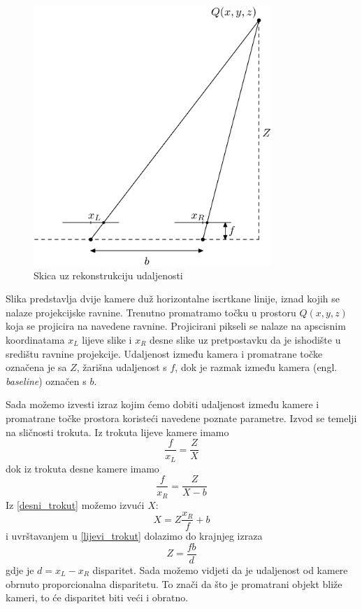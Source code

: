 \documentclass[utf8, zavrsni, numeric]{fer}
\begin{document}
\begin{figure}[htb]
  \centering
  \includegraphics[width=9cm]{img/rekonstrukcija_udaljenosti.png}
  \caption{Skica uz rekonstrukciju udaljenosti}
  \label{fig:rekonstrukcija_udaljenosti}
\end{figure}

Slika predstavlja dvije kamere duž horizontalne iscrtkane linije, iznad kojih se
nalaze projekcijske ravnine. Trenutno promatramo točku u prostoru $Q(x, y, z)$ koja se projicira na navedene ravnine.
Projicirani pikseli se nalaze na apscisnim koordinatama $x_L$ lijeve slike i
$x_R$ desne slike uz pretpostavku da je ishodište u središtu ravnine projekcije. Udaljenost između kamera i promatrane točke označena je sa $Z$, žarišna
udaljenost s $f$, dok je razmak između kamera (engl. {\sl baseline}) označen s $b$.

Sada možemo izvesti izraz kojim ćemo dobiti udaljenost između kamere i promatrane točke prostora
koristeći navedene poznate parametre. Izvod se temelji na sličnosti trokuta. Iz trokuta lijeve kamere imamo
\begin{equation}
\frac{f}{x_L} = \frac{Z}{X} \label{lijevi_trokut}
\end{equation}
dok iz trokuta desne kamere imamo
\begin{equation}
\frac{f}{x_R} = \frac{Z}{X - b} \label{desni_trokut}
\end{equation}
Iz \ref{desni_trokut} možemo izvući $X$:
\begin{equation}
X = Z\frac{x_R}{f} + b \label{desni_x}
\end{equation}
i uvrštavanjem u \ref{lijevi_trokut} dolazimo do krajnjeg izraza
\begin{equation}
Z = \frac{fb}{d} \label{udaljenost}
\end{equation}
gdje je $d = x_L - x_R$ disparitet.
Sada možemo vidjeti da je udaljenost od kamere obrnuto proporcionalna disparitetu. To znači da što
je promatrani objekt bliže kameri, to će disparitet biti veći i obratno.
\end{document}
